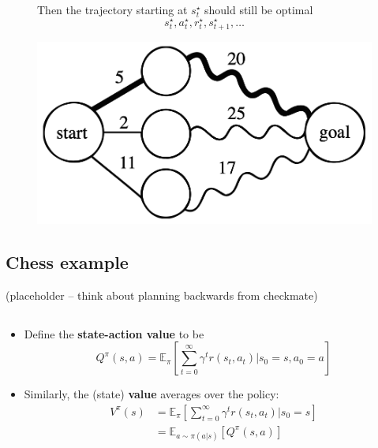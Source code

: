 \documentclass[
  letterpaper,
  DIV=11,
  numbers=noendperiod,
  oneside]{scrartcl}
\providecommand{\tightlist}{%
  \setlength{\itemsep}{0pt}\setlength{\parskip}{0pt}}\usepackage{longtable,booktabs,array}
\begin{document}
\begin{figure}

\begin{minipage}{0.67\linewidth}
Then the trajectory starting at \(s_t^\star\) should still be optimal
\[s_{t}^\star, a_{t}^\star, r_{t}^\star, s_{t+1}^\star, \ldots\]\end{minipage}%
%
\begin{minipage}{0.33\linewidth}
\begin{center}
\includegraphics{figs/subpath.png}
\end{center}
\end{minipage}%

\end{figure}%


\subsection{Chess example}\label{chess-example}

(placeholder -- think about planning backwards from checkmate)

\subsection{}\label{section-6}

\begin{itemize}
\tightlist
\item
  Define the \textbf{state-action value} to be
  \[Q^\pi (s,a) = \mathbb{E}_{\pi}\left[ \sum_{t=0}^{\infty} \gamma^{t}r(s_t,a_t) | s_0 = s, a_0 = a \right]\]
\item
  Similarly, the (state) \textbf{value} averages over the policy:
  \begin{align}
  V^\pi (s) &= \mathbb{E}_{\pi}\left[ \sum_{t=0}^{\infty} \gamma^{t}r(s_t,a_t) | s_0 = s \right]\\
  &= \mathbb{E}_{a \sim \pi(a | s)}\left[ Q^\pi (s,a) \right]
  \end{align}
\end{itemize}
\end{document}
